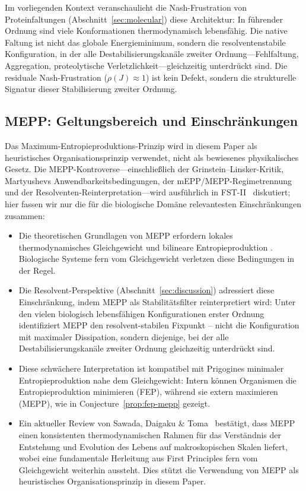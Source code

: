 \documentclass[12pt,a4paper]{article}
\theoremstyle{remark}
\begin{document}
Im vorliegenden Kontext veranschaulicht die Nash-Frustration von Proteinfaltungen (Abschnitt~\ref{sec:molecular}) diese Architektur: In f\"uhrender Ordnung sind viele Konformationen thermodynamisch lebensfähig. Die native Faltung ist nicht das globale Energieminimum, sondern die resolventenstabile Konfiguration, in der alle Destabilisierungskan\"ale zweiter Ordnung---Fehlfaltung, Aggregation, proteolytische Verletzlichkeit---gleichzeitig unterdr\"uckt sind. Die residuale Nash-Frustration ($\rho(J) \approx 1$) ist kein Defekt, sondern die strukturelle Signatur dieser Stabilisierung zweiter Ordnung.

\subsection{MEPP: Geltungsbereich und Einschr\"ankungen}

Das Maximum-Entropieproduktions-Prinzip wird in diesem Paper als heuristisches Organisationsprinzip verwendet, nicht als bewiesenes physikalisches Gesetz. Die MEPP-Kontroverse---einschlie\ss{}lich der Grinstein--Linsker-Kritik, Martyushevs Anwendbarkeitsbedingungen, der mEPP/MEPP-Regimetrennung und der Resolventen-Reinterpretation---wird ausf\"uhrlich in FST-II~\citep{FSTII} diskutiert; hier fassen wir nur die f\"ur die biologische Dom\"ane relevantesten Einschr\"ankungen zusammen:
\begin{itemize}
\item Die theoretischen Grundlagen von MEPP erfordern lokales thermodynamisches Gleichgewicht und bilineare Entropieproduktion \citep{Martyushev2010}. Biologische Systeme fern vom Gleichgewicht verletzen diese Bedingungen in der Regel.
\item Die Resolvent-Perspektive (Abschnitt~\ref{sec:discussion}) adressiert diese Einschr\"ankung, indem MEPP als Stabilit\"atsfilter reinterpretiert wird: Unter den vielen biologisch lebensf\"ahigen Konfigurationen erster Ordnung identifiziert MEPP den resolvent-stabilen Fixpunkt -- nicht die Konfiguration mit maximaler Dissipation, sondern diejenige, bei der alle Destabilisierungskan\"ale zweiter Ordnung gleichzeitig unterdr\"uckt sind.
\item Diese schw\"achere Interpretation ist kompatibel mit Prigogines minimaler Entropieproduktion nahe dem Gleichgewicht: Intern k\"onnen Organismen die Entropieproduktion minimieren (FEP), w\"ahrend sie extern maximieren (MEPP), wie in Conjecture~\ref{prop:fep-mepp} gezeigt.
\item Ein aktueller Review von Sawada, Daigaku \& Toma~\citep{Toma2025} best\"atigt, dass MEPP einen konsistenten thermodynamischen Rahmen f\"ur das Verst\"andnis der Entstehung und Evolution des Lebens auf makroskopischen Skalen liefert, wobei eine fundamentale Herleitung aus First Principles fern vom Gleichgewicht weiterhin aussteht. Dies st\"utzt die Verwendung von MEPP als heuristisches Organisationsprinzip in diesem Paper.
\end{itemize}
\end{document}
